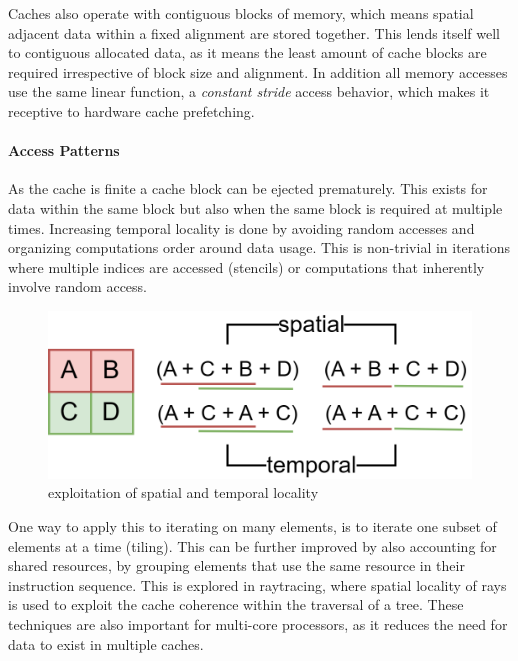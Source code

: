 \documentclass{article}
\begin{document}
Caches also operate with contiguous blocks of memory, which means spatial adjacent data within a fixed alignment are stored together.
This lends itself well to contiguous allocated data, as it means the least amount of cache blocks are required irrespective of block size and alignment.
In addition all memory accesses use the same linear function, a {\it constant stride} access behavior, which makes it receptive to hardware cache prefetching\cite{cache-prefetching}. 

\paragraph{Access Patterns}

As the cache is finite a cache block can be ejected prematurely.
This exists for data within the same block but also when the same block is required at multiple times.
Increasing temporal locality is done by avoiding random accesses and organizing computations order around data usage.
This is non-trivial in iterations where multiple indices are accessed (stencils) or computations that inherently involve random access.

\begin{figure}[ht]
    \centering
    \includegraphics[scale=0.25]{locality}
    \caption{ exploitation of spatial and temporal locality }
\end{figure}

\newpage

One way to apply this to iterating on many elements, is to iterate one subset of elements at a time (tiling).
This can be further improved by also accounting for shared resources, by grouping elements that use the same resource in their instruction sequence. 
This is explored in raytracing\cite{raytracing-reorder-ray}, where spatial locality of rays is used to exploit the cache coherence within the traversal of a tree.
These techniques are also important for multi-core processors, as it reduces the need for data to exist in multiple caches.
\end{document}
